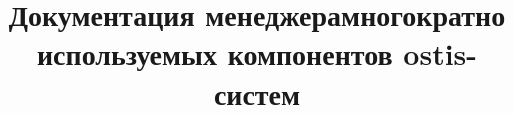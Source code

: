 \documentclass{scndocument}
\begin{document}
\DeactivateBG
\title{\centering
Документация менеджерамногократно используемых компонентов ostis-систем}
\author{}
\maketitle

\normalsize

\setcounter{page}{3}

\ActivateBG
\begin{SCn}

\end{SCn}
\end{document}
